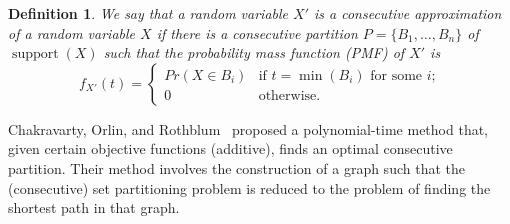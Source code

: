 \documentclass{article}
\newtheorem{definition}[thm]{Definition}
\DeclareMathOperator{\support}{support}
\begin{document}
\begin{definition}\label{def:RVpartition}
	We say that a random variable $X'$ is a \emph{consecutive approximation} of a random variable $X$ if there is a consecutive partition $P=\{B_1,\dots,B_n\}$ of $\support(X)$ such that the probability mass function (PMF) of $X'$ is 
	$$f_{X'}(t) = 
	\begin{cases} 
	Pr(X {\in} B_i) &  \text{if $t = \min(B_i)$ for some $i$;}\\
	0          &  \text{otherwise.}
	\end{cases}$$
\end{definition}



Chakravarty, Orlin, and Rothblum~\cite{chakravarty1982partitioning} proposed a polynomial-time method that, given certain objective functions (additive), finds an optimal consecutive partition. Their method involves the construction of a graph such that the (consecutive) set partitioning problem is reduced to the problem of finding the shortest path in that graph.
\end{document}
